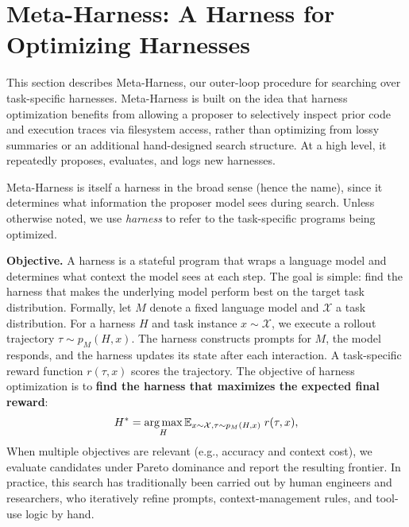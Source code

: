 \section{Meta-Harness: A Harness for Optimizing Harnesses}
\label{sec:meta-harness}

This section describes Meta-Harness, our outer-loop procedure for searching over task-specific harnesses.
Meta-Harness is built on the idea that harness optimization benefits from allowing a proposer to selectively inspect prior code and execution traces via filesystem access, rather than optimizing from lossy summaries or an additional hand-designed search structure.
At a high level, it repeatedly proposes, evaluates, and logs new harnesses.

Meta-Harness is itself a harness in the broad sense (hence the name), since it determines what information the proposer model sees during search.
Unless otherwise noted, we use \emph{harness} to refer to the task-specific programs being optimized.

\textbf{Objective.}
A harness is a stateful program that wraps a language model and determines what context the model sees at each step.
The goal is simple: find the harness that makes the underlying model perform best on the target task distribution.
Formally, let $M$ denote a fixed language model and $\mathcal{X}$ a task distribution.
For a harness $H$ and task instance $x \sim \mathcal{X}$, we execute a rollout trajectory $\tau \sim p_M(H, x)$.
The harness constructs prompts for $M$, the model responds, and the harness updates its state after each interaction.
A task-specific reward function $r(\tau, x)$ scores the trajectory.
The objective of harness optimization is to \textbf{find the harness that maximizes the expected final reward}:
\[
H^* = \operatorname*{arg\,max}_{H} \mathbb{E}_{x \sim \mathcal{X}, \tau \sim p_M(H, x)} \; r(\tau, x),
\]
When multiple objectives are relevant (e.g., accuracy and context cost), we evaluate candidates under Pareto dominance and report the resulting frontier.
In practice, this search has traditionally been carried out by human engineers and researchers, who iteratively refine prompts, context-management rules, and tool-use logic by hand.


